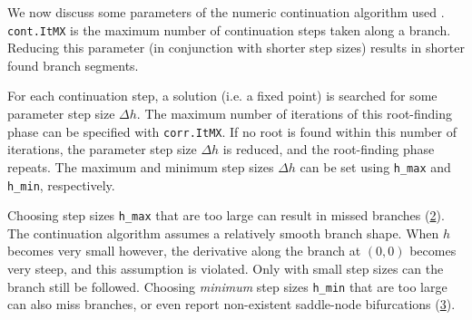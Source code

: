 \begin{figure}
\label{fig:fold_curve}
\end{figure}


We now discuss some parameters of the numeric continuation algorithm used \cite{Schilder2018}. \texttt{cont.ItMX} is the maximum number of continuation steps taken along a branch. Reducing this parameter (in conjunction with shorter step sizes) results in shorter found branch segments.

For each continuation step, a solution (i.e. a fixed point) is searched for some parameter step size $\Delta h$. The maximum number of iterations of this root-finding phase can be specified with \texttt{corr.ItMX}. If no root is found within this number of iterations, the parameter step size $\Delta h$ is reduced, and the root-finding phase repeats. The maximum and minimum step sizes $\Delta h$ can be set using \texttt{h\_max} and \texttt{h\_min}, respectively.

Choosing step sizes \texttt{h\_max} that are too large can result in missed branches (\cref{fig:numerics}). The continuation algorithm assumes a relatively smooth branch shape. When $h$ becomes very small however, the derivative along the branch at $(0, 0)$ becomes very steep, and this assumption is violated. Only with small step sizes can the branch still be followed. Choosing \emph{minimum} step sizes \texttt{h\_min} that are too large can also miss branches, or even report non-existent saddle-node bifurcations (\cref{fig:two_SN}).

\begin{figure}
\label{fig:numerics}
\end{figure}

\begin{figure}
\label{fig:two_SN}
\end{figure}

